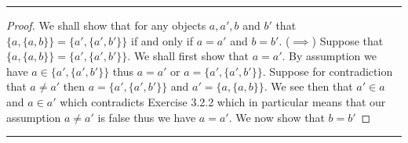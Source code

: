 \documentclass{article}
\newcommand{\lined}{\noindent\rule{\textwidth}{1pt}}
\begin{document}
	\lined
	\begin{proof}
		We shall show that for any objects $a,a',b$ and $b'$ that $\{a,\{a,b\}\} = \{a',\{a',b'\}\}$ if and only if $a = a'$ and
		$b = b'$. ($\implies$) Suppose that  $\{a,\{a,b\}\} = \{a',\{a',b'\}\}$. We shall first show that $a = a'$. By assumption we have
		$a \in \{a',\{a',b'\}\}$ thus $a = a'$ or $a = \{a',\{a',b'\}\}$. Suppose for contradiction that $a \neq a'$ then  $a = \{a',\{a',b'\}\}$ and  $a' = \{a,\{a,b\}\}$. We see then that $a' \in a$ and $a \in a'$ which contradicts Exercise 3.2.2 which in particular means that our assumption $a \neq a'$  is false thus we have $a = a'$. We now show that $b = b'$
	\end{proof}
	\lined



	
\end{document}
